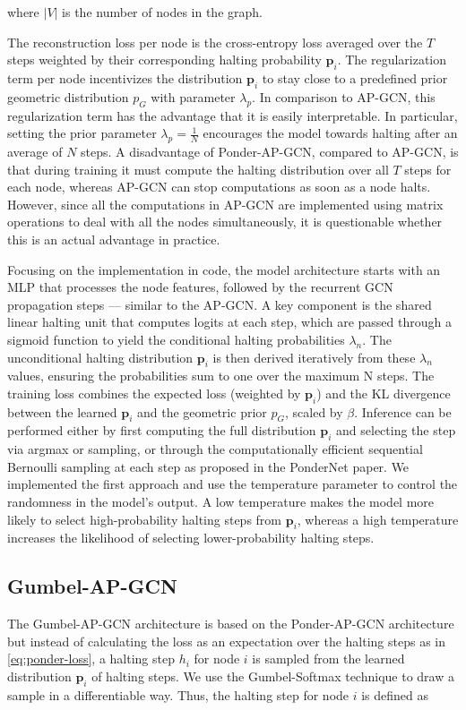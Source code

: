 \documentclass{gdl}
\begin{document}
\noindent where $|V|$ is the number of nodes in the graph.

\noindent The reconstruction loss per node is the cross-entropy loss averaged over the $T$ steps weighted by their corresponding halting probability $\mathbf{p}_i$. The regularization term per node incentivizes the distribution $\mathbf{p}_i$ to stay close to a predefined prior geometric distribution $p_G$ with parameter $\lambda_p$. In comparison to AP-GCN, this regularization term has the advantage that it is easily interpretable. In particular, setting the prior parameter $\lambda_p = \frac{1}{N}$ encourages the model towards halting after an average of $N$ steps. A disadvantage of Ponder-AP-GCN, compared to AP-GCN, is that during training it must compute the halting distribution over all $T$ steps for each node, whereas AP-GCN can stop computations as soon as a node halts. However, since all the computations in AP-GCN are implemented using matrix operations to deal with all the nodes simultaneously, it is questionable whether this is an actual advantage in practice.

Focusing on the implementation in code, the model architecture starts with an MLP that processes the node features, followed by the recurrent GCN propagation steps --- similar to the AP-GCN. A key component is the shared linear halting unit that computes logits at each step, which are passed through a sigmoid function to yield the conditional halting probabilities $\lambda_n$. The unconditional halting distribution $\mathbf{p}_i$ is then derived iteratively from these $\lambda_n$  values, ensuring the probabilities sum to one over the maximum N steps. The training loss combines the expected loss (weighted by $\mathbf{p}_i$) and the KL divergence between the learned $\mathbf{p}_i$ and the geometric prior $p_G$, scaled by $\beta$. Inference can be performed either by first computing the full distribution $\mathbf{p}_i$ and selecting the step via argmax or sampling, or through the computationally efficient sequential Bernoulli sampling at each step as proposed in the PonderNet paper. We implemented the first approach and use the temperature parameter to control the randomness in the model's output. A low temperature makes the model more likely to select high-probability halting steps from $\mathbf{p}_i$, whereas a high temperature increases the likelihood of selecting lower-probability halting steps.

\subsection{Gumbel-AP-GCN}
The Gumbel-AP-GCN architecture is based on the Ponder-AP-GCN architecture but instead of calculating the loss as an expectation over the halting steps as in \autoref{eq:ponder-loss}, a halting step $h_i$ for node $i$ is sampled from the learned distribution $\mathbf{p}_i$ of halting steps. We use the Gumbel-Softmax technique \cite{Maddison2017, Jang2017} to draw a sample in a differentiable way. Thus, the halting step for node $i$ is defined as
\end{document}
